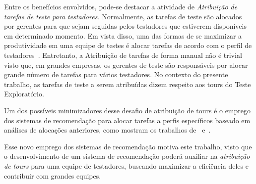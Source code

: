 Entre os benefícios envolvidos, pode-se destacar a atividade de \textit{Atribuição de tarefas de teste para testadores.}
Normalmente, as tarefas de teste são alocados por gerentes para que sejam seguidas pelos testadores que estiverem disponíveis em determinado momento. Em vista disso, uma das formas de se maximizar a produtividade em uma equipe de testes é alocar tarefas de acordo com o perfil de testadores~\cite{miranda2012recommender}. Entretanto, a Atribuição de tarefas de forma manual não é trivial visto que, em grandes empresas, os gerentes de teste são responsáveis por alocar grande número de tarefas para vários testadores. No contexto do presente trabalho, as tarefas de teste a serem atribuídas dizem respeito aos tours do Teste Exploratório.

Um dos possíveis minimizadores desse desafio de atribuição de tours é o emprego dos sistemas de recomendação para alocar tarefas a perfis específicos baseado em análises de alocações anteriores, 
como mostram os trabalhos de~\cite{anvik2006should} e~\cite{miranda2012recommender}.

Esse novo  emprego dos sistemas de recomendação motiva este trabalho, visto que o desenvolvimento de um sistema de recomendação poderá auxiliar na \textit{atribuição de tours} para uma equipe de testadores, buscando maximizar a eficiência deles e contribuir com grandes equipes.










